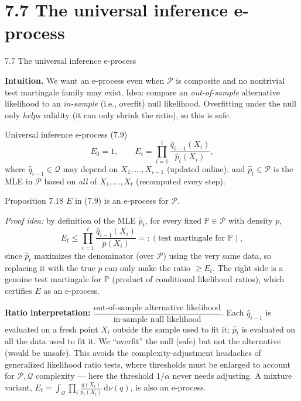 \documentclass[aspectratio=169,10pt]{beamer}
\begin{document}
\section{7.7 The universal inference e-process}

\begin{frame}[allowframebreaks]{7.7 The universal inference e-process}

\textbf{Intuition.} We want an e-process even when $\mathcal P$ is composite and no nontrivial test martingale
family may exist. Idea: compare an \emph{out-of-sample} alternative likelihood to an \emph{in-sample} (i.e.,
overfit) null likelihood. Overfitting under the null only \emph{helps} validity (it can only shrink the ratio), so
this is safe.

\begin{block}{Universal inference e-process (7.9)}
$$E_0=1,\qquad E_t = \prod_{i=1}^t \frac{\hat q_{i-1}(X_i)}{\hat p_t(X_i)},$$
where $\hat q_{i-1}\in\mathcal Q$ may depend on $X_1,\dots,X_{i-1}$ (updated online), and $\hat p_t \in \mathcal P$
is the MLE in $\mathcal P$ based on \emph{all} of $X_1,\dots,X_t$ (recomputed every step).
\end{block}

\begin{block}{Proposition 7.18}
$E$ in (7.9) is an e-process for $\mathcal P$.
\end{block}
\emph{Proof idea:} by definition of the MLE $\hat p_t$, for every fixed $\mathbb P \in \mathcal P$ with density $p$,
$$E_t \le \prod_{i=1}^t \frac{\hat q_{i-1}(X_i)}{p(X_i)} =: (\text{test martingale for } \mathbb P),$$
since $\hat p_t$ maximizes the denominator (over $\mathcal P$) using the very same data, so replacing it with the
true $p$ can only make the ratio $\ge E_t$. The right side is a genuine test martingale for $\mathbb P$ (product
of conditional likelihood ratios), which certifies $E$ as an e-process.

\framebreak

\textbf{Ratio interpretation:} $\dfrac{\text{out-of-sample alternative likelihood}}{\text{in-sample null likelihood}}$.
Each $\hat q_{i-1}$ is evaluated on a fresh point $X_i$ outside the sample used to fit it; $\hat p_t$ is evaluated
on all the data used to fit it. We ``overfit'' the null (safe) but not the alternative (would be unsafe). This
avoids the complexity-adjustment headaches of generalized likelihood ratio tests, where thresholds must be enlarged
to account for $\mathcal P,\mathcal Q$ complexity --- here the threshold $1/\alpha$ never needs adjusting. A
mixture variant, $E_t = \int_{\mathcal Q} \prod_i \frac{q(X_i)}{\hat p_t(X_i)}\,\mathrm d\nu(q)$, is also an
e-process.

\end{frame}
\end{document}

